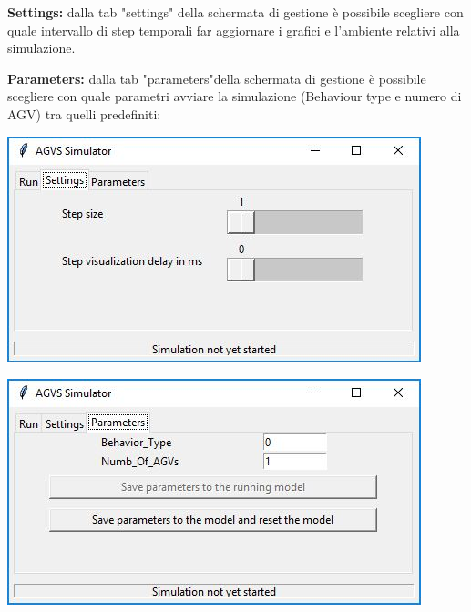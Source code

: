 \documentclass[12pt]{article}
\begin{document}
\newpage

\begin{minipage}[ht]{0.45\linewidth}
\textbf{Settings:} dalla tab "settings" della schermata di gestione è possibile scegliere con quale intervallo di step temporali far aggiornare i grafici e l'ambiente relativi alla simulazione.
\vspace{0.3cm}
\end{minipage}
\hspace{0.5cm}
\begin{minipage}[ht]{0.45\linewidth}
\textbf{Parameters:} dalla tab "parameters"della schermata di gestione è possibile scegliere con quale parametri avviare la simulazione (Behaviour type e numero di AGV) tra quelli predefiniti:
\vspace{0.3cm}
\end{minipage}

\begin{minipage}[ht]{0.45\linewidth}
\centering
\includegraphics[width=\textwidth]{Figures/GUI/Console2.jpg}
\end{minipage}
\hspace{0.5cm}
\begin{minipage}[ht]{0.45\linewidth}
\centering
\includegraphics[width=\textwidth]{Figures/GUI/Console3.jpg}
\end{minipage}
\end{document}
